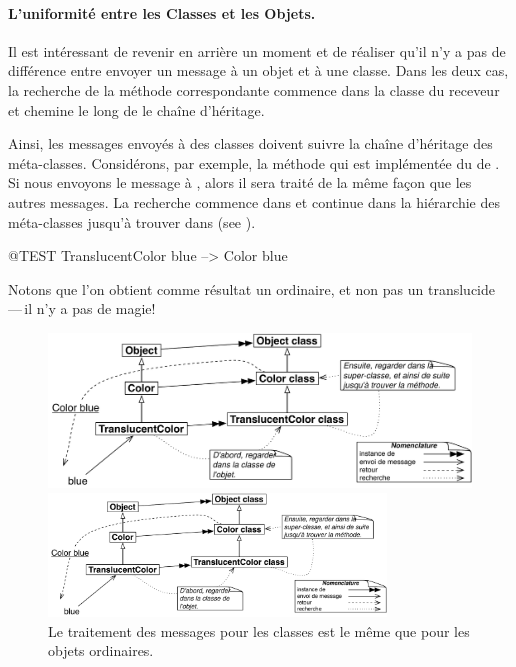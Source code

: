 \documentclass[a4paper,10pt,twoside]{book}
\begin{document}
\paragraph{L'uniformité entre les Classes et les Objets.}
Il est intéressant de revenir en arrière un moment et de réaliser qu'il n'y a pas de différence entre envoyer un message à un objet et à une classe.
Dans les deux cas, la recherche de la méthode correspondante commence dans la classe du receveur et chemine le long de le chaîne d'héritage.

Ainsi, les messages envoyés à des classes doivent suivre la chaîne d'héritage des méta-classes. 
Considérons, par exemple, la méthode  qui est implémentée du  de .
Si nous envoyons le message  à , alors il sera traité de la même façon que les autres messages.
La recherche commence dans  et continue dans la hiérarchie des méta-classes jusqu'à trouver dans   (see ).

\begin{code}{@TEST}
TranslucentColor blue --> Color blue
\end{code}
\noindent
Notons que l'on obtient comme résultat un   ordinaire, et non pas un translucide\,---\,il n'y a pas de magie!

\begin{center}
\begin{figure}[!ht]
\ifluluelse
	{\centerline {\includegraphics[width=\textwidth]{TranslucentColorBlue}}}
	{\centerline {\includegraphics[width=0.8\textwidth]{TranslucentColorBlue}}}
\caption{Le traitement des messages pour les classes est le même que pour les objets ordinaires.\label{fig:metaclasslookup}}
\end{figure}
\end{center}
\end{document}
